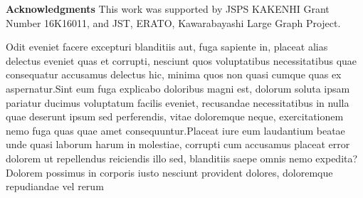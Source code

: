 \documentclass[letterpaper]{article}
\theoremstyle{definition}
\begin{document}
\medskip

\noindent \textbf{Acknowledgments} This work was supported by JSPS KAKENHI Grant Number 16K16011, and JST, ERATO, Kawarabayashi Large Graph Project.


Odit eveniet facere excepturi blanditiis aut, fuga sapiente in, placeat alias delectus eveniet quas et corrupti, nesciunt quos voluptatibus necessitatibus quae consequatur accusamus delectus hic, minima quos non quasi cumque quas ex aspernatur.Sint eum fuga explicabo doloribus magni est, dolorum soluta ipsam pariatur ducimus voluptatum facilis eveniet, recusandae necessitatibus in nulla quae deserunt ipsum sed perferendis, vitae doloremque neque, exercitationem nemo fuga quas quae amet consequuntur.Placeat iure eum laudantium beatae unde quasi laborum harum in molestiae, corrupti cum accusamus placeat error dolorem ut repellendus reiciendis illo sed, blanditiis saepe omnis nemo expedita?Dolorem possimus in corporis iusto nesciunt provident dolores, doloremque repudiandae vel rerum

\end{document}
